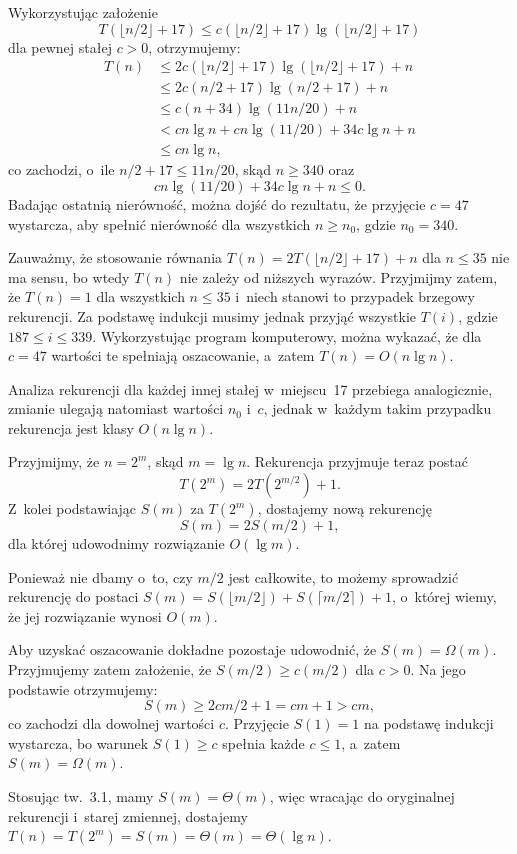 \exercise %
Wykorzystując założenie
\[
	T(\lfloor n/2\rfloor+17) \le c(\lfloor n/2\rfloor+17)\lg(\lfloor n/2\rfloor+17)
\]
dla pewnej stałej $c>0$, otrzymujemy:
\begin{align*}
	T(n) &\le 2c(\lfloor n/2\rfloor+17)\lg(\lfloor n/2\rfloor+17)+n \\
	&\le 2c(n/2+17)\lg(n/2+17)+n \\
	&\le c(n+34)\lg(11n/20)+n \\
	&< cn\lg n+cn\lg(11/20)+34c\lg n+n \\
	&\le cn\lg n,
\end{align*}
co zachodzi, o~ile $n/2+17\le 11n/20$, skąd $n\ge340$ oraz
\[
	cn\lg(11/20)+34c\lg n+n \le 0.
\]
Badając ostatnią nierówność, można dojść do rezultatu, że przyjęcie $c=47$ wystarcza, aby spełnić nierówność dla wszystkich $n\ge n_0$, gdzie $n_0=340$.

Zauważmy, że stosowanie równania $T(n)=2T(\lfloor n/2\rfloor+17)+n$ dla $n\le35$ nie ma sensu, bo wtedy $T(n)$ nie zależy od niższych wyrazów. Przyjmijmy zatem, że $T(n)=1$ dla wszystkich $n\le35$ i~niech stanowi to przypadek brzegowy rekurencji. Za podstawę indukcji musimy jednak przyjąć wszystkie $T(i)$, gdzie $187\le i\le339$. Wykorzystując program komputerowy, można wykazać, że dla $c=47$ wartości te spełniają oszacowanie, a~zatem $T(n)=O(n\lg n)$.

Analiza rekurencji dla każdej innej stałej w~miejscu~17 przebiega analogicznie, zmianie ulegają natomiast wartości $n_0$ i~$c$, jednak w~każdym takim przypadku rekurencja jest klasy $O(n\lg n)$.

\exercise %
Przyjmijmy, że $n=2^m$, skąd $m=\lg n$. Rekurencja przyjmuje teraz postać
\[
	T(2^m) = 2T(2^{m/2})+1.
\]
Z~kolei podstawiając $S(m)$ za $T(2^m)$, dostajemy nową rekurencję
\[
	S(m) = 2S(m/2)+1,
\]
dla której udowodnimy rozwiązanie $O(\lg m)$.

Ponieważ nie dbamy o~to, czy $m/2$ jest całkowite, to możemy sprowadzić rekurencję do postaci $S(m)=S(\lfloor m/2\rfloor)+S(\lceil m/2\rceil)+1$, o~której wiemy, że jej rozwiązanie wynosi $O(m)$.

Aby uzyskać oszacowanie dokładne pozostaje udowodnić, że $S(m)=\Omega(m)$. Przyjmujemy zatem założenie, że $S(m/2)\ge c(m/2)$ dla $c>0$. Na jego podstawie otrzymujemy:
\[
	S(m) \ge 2cm/2+1 = cm+1 > cm,
\]
co zachodzi dla dowolnej wartości $c$. Przyjęcie $S(1)=1$ na podstawę indukcji wystarcza, bo warunek $S(1)\ge c$ spełnia każde $c\le1$, a~zatem $S(m)=\Omega(m)$.

Stosując tw.~3.1, mamy $S(m)=\Theta(m)$, więc wracając do oryginalnej rekurencji i~starej zmiennej, dostajemy $T(n)=T(2^m)=S(m)=\Theta(m)=\Theta(\lg n)$.

